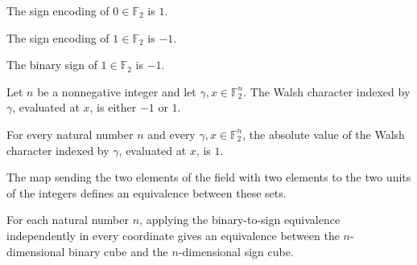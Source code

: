 \begin{theorem}
\label{FABL.signEncode_zero}
\leanok
{}
The sign encoding of $0\in\mathbb{F}_2$ is $1$.
\end{theorem}

\begin{theorem}
\label{FABL.signEncode_one}
\leanok
{}
The sign encoding of $1\in\mathbb{F}_2$ is $-1$.
\end{theorem}

\begin{theorem}
\label{FABL.binarySign_one}
\leanok
{}
The binary sign of $1\in\mathbb{F}_2$ is $-1$.
\end{theorem}

\begin{theorem}
\label{FABL.vectorWalshCharacter_eq_neg_one_or_one}
\leanok
{}
Let $n$ be a nonnegative integer and let $\gamma,x\in\mathbb F_2^n$. The Walsh character
indexed by $\gamma$, evaluated at $x$, is either $-1$ or $1$.
\end{theorem}

\begin{theorem}
\label{FABL.abs_vectorWalshCharacter}
\leanok
{}
For every natural number $n$ and every $\gamma,x\in\mathbb F_2^n$, the absolute value of
the Walsh character indexed by $\gamma$, evaluated at $x$, is $1$.
\end{theorem}

\begin{definition}
\label{FABL.binarySignEquiv}
\leanok
{}
The map sending the two elements of the field with two elements to the two units of the
integers defines an equivalence between these sets.
\end{definition}

\begin{definition}
\label{FABL.binaryCubeSignEquiv}
\leanok
{}
For each natural number $n$, applying the binary-to-sign equivalence independently in
every coordinate gives an equivalence between the $n$-dimensional binary cube and the
$n$-dimensional sign cube.
\end{definition}

